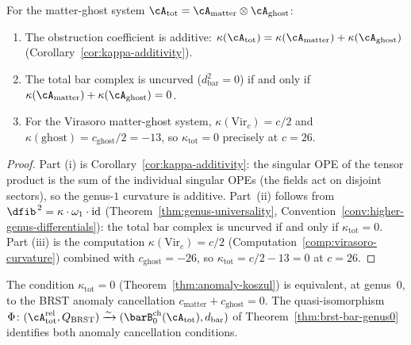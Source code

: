 \begin{theorem}\label{thm:anomaly-koszul}
For the matter-ghost system
$\cA_{\mathrm{tot}} = \cA_{\mathrm{matter}} \otimes \cA_{\mathrm{ghost}}$:
\begin{enumerate}[label=\textup{(\roman*)}]
\item The obstruction coefficient is additive:
 $\kappa(\cA_{\mathrm{tot}}) = \kappa(\cA_{\mathrm{matter}}) + \kappa(\cA_{\mathrm{ghost}})$
 \textup{(}Corollary~\textup{\ref{cor:kappa-additivity})}.
\item The total bar complex is uncurved
 ($d_{\mathrm{bar}}^2 = 0$) if and only if
 $\kappa(\cA_{\mathrm{matter}}) + \kappa(\cA_{\mathrm{ghost}}) = 0$.
\item For the Virasoro matter-ghost system,
 $\kappa(\mathrm{Vir}_c) = c/2$ and
 $\kappa(\mathrm{ghost}) = c_{\mathrm{ghost}}/2 = -13$, so
 $\kappa_{\mathrm{tot}} = 0$ precisely at $c = 26$.
\end{enumerate}
\end{theorem}

\begin{proof}
Part (i) is Corollary~\ref{cor:kappa-additivity}: the singular OPE
of the tensor product is the sum of the individual singular OPEs
(the fields act on disjoint sectors), so the genus-$1$ curvature
is additive. Part~(ii) follows from
$\dfib^{\,2} = \kappa \cdot \omega_1 \cdot \mathrm{id}$
(Theorem~\ref{thm:genus-universality},
Convention~\ref{conv:higher-genus-differentials}): the total bar complex is
uncurved if and only if $\kappa_{\mathrm{tot}} = 0$. Part (iii)
is the computation $\kappa(\mathrm{Vir}_c) = c/2$
(Computation~\ref{comp:virasoro-curvature}) combined with
$c_{\mathrm{ghost}} = -26$, so
$\kappa_{\mathrm{tot}} = c/2 - 13 = 0$ at $c = 26$.
\end{proof}

\begin{theorem}\label{thm:anomaly-physical-genus0}
The condition $\kappa_{\mathrm{tot}} = 0$
\textup{(}Theorem~\textup{\ref{thm:anomaly-koszul})} is equivalent,
at genus~$0$, to the BRST anomaly cancellation
$c_{\mathrm{matter}} + c_{\mathrm{ghost}} = 0$. The quasi-isomorphism
$\Phi \colon (\cA_{\mathrm{tot}}^{\mathrm{rel}}, Q_{\mathrm{BRST}})
\xrightarrow{\sim} (\barB^{\mathrm{ch}}_0(\cA_{\mathrm{tot}}),
d_{\mathrm{bar}})$ of Theorem~\textup{\ref{thm:brst-bar-genus0}}
identifies both anomaly cancellation conditions.
\end{theorem}

